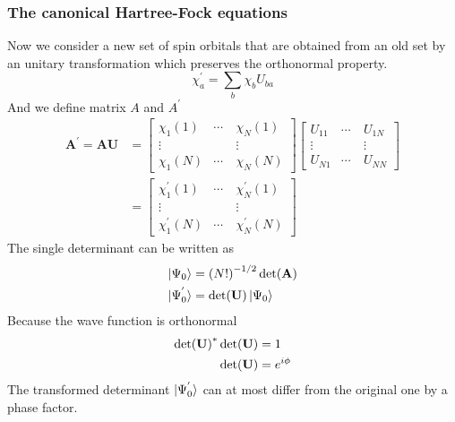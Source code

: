 \documentclass[11pt]{article}
\begin{document}
\subsubsection{The canonical Hartree-Fock equations}
Now we consider a new set of spin orbitals that are obtained from an old set by an unitary transformation which preserves the orthonormal property.
\begin{equation}
    \chi_a^{'}=\sum_{b}\chi_b U_{ba}
\end{equation}
And we define matrix \textbf{$A$} and \textbf{$A^{'}$}
\begin{equation}
    \begin{split}
        \mathbf{A^{'}}=\mathbf{AU}&=
            \begin{bmatrix}
                \chi_1(1)&\cdots&\chi_N(1)\\
                \vdots&\quad&\vdots\\
                \chi_1(N)&\cdots&\chi_N(N)
            \end{bmatrix}
            \begin{bmatrix}
                U_{11}&\cdots&U_{1N}\\
                \vdots&\quad&\vdots\\
                U_{N1}&\cdots&U_{NN}
            \end{bmatrix}\\
            &=
            \begin{bmatrix}
                \chi_1^{'}(1)&\cdots&\chi_N^{'}(1)\\
                \vdots&\quad&\vdots\\
                \chi_1^{'}(N)&\cdots&\chi_N^{'}(N)
            \end{bmatrix}
    \end{split}    
\end{equation}
The single determinant can be written as
\begin{align}
    \ket{\Psi_0}&={(N!)}^{-1/2} \det(\mathbf{A})\\
    \ket{\Psi_0^{'}}&=\det(\mathbf{U})\ket{\Psi_0}\\
\end{align}
Because the wave function is orthonormal
\begin{align}
    {\det(\mathbf{U})}^*\det(\mathbf{U})&=1\notag \\
    \det(\mathbf{U})&=e^{i\phi}
\end{align}
The transformed determinant $\ket{\Psi_0^{'}}$ can at most differ from the original one by a phase factor. 
\end{document}
